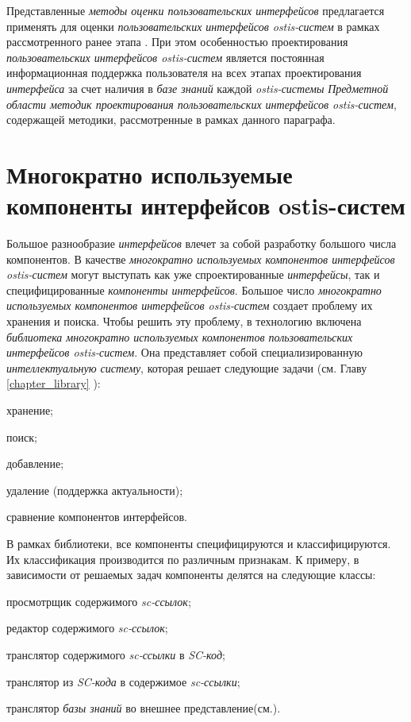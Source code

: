 {Представленные \textit{методы оценки пользовательских интерфейсов} предлагается применять для оценки \textit{пользовательских интерфейсов ostis-систем} в рамках рассмотренного ранее этапа . При этом особенностью проектирования \textit{пользовательских интерфейсов ostis-систем} является постоянная информационная поддержка пользователя на всех этапах проектирования \textit{интерфейса} за счет наличия в \textit{базе знаний} каждой \textit{ostis-системы} \textit{Предметной области методик проектирования пользовательских интерфейсов ostis-систем}, содержащей методики, рассмотренные в рамках данного параграфа.


\section{Многократно используемые компоненты интерфейсов ostis-систем}
\label{sec_reusable_UI_components}

Большое разнообразие \textit{интерфейсов} влечет за собой разработку большого числа компонентов. В качестве \textit{многократно используемых компонентов интерфейсов ostis-систем} могут выступать как уже спроектированные
\textit{интерфейсы}, так и специфицированные \textit{компоненты интерфейсов}. Большое число \textit{многократно используемых компонентов интерфейсов ostis-систем} создает проблему их хранения и поиска. Чтобы решить эту проблему, в технологию включена \textit{библиотека многократно используемых компонентов пользовательских интерфейсов ostis-систем}. Она представляет собой специализированную \textit{интеллектуальную систему}, которая решает следующие задачи (см. Главу \ref{chapter_library} ):
\begin{textitemize}
	\item хранение;
	\item поиск;
	\item добавление;
	\item удаление (поддержка актуальности);
	\item сравнение компонентов интерфейсов.
\end{textitemize}

В рамках библиотеки, все компоненты специфицируются и классифицируются. Их классификация производится по различным признакам. К примеру, в зависимости от решаемых задач компоненты делятся на следующие классы:

\begin{textitemize}
	\item просмотрщик содержимого \textit{sc-ссылок};
	\item редактор содержимого \textit{sc-ссылок};
	\item транслятор содержимого \textit{sc-ссылки} в \textit{SC-код};
	\item транслятор из \textit{SC-кода} в содержимое \textit{sc-ссылки};
	\item транслятор \textit{базы знаний} во внешнее представление(см.).
\end{textitemize}

}
